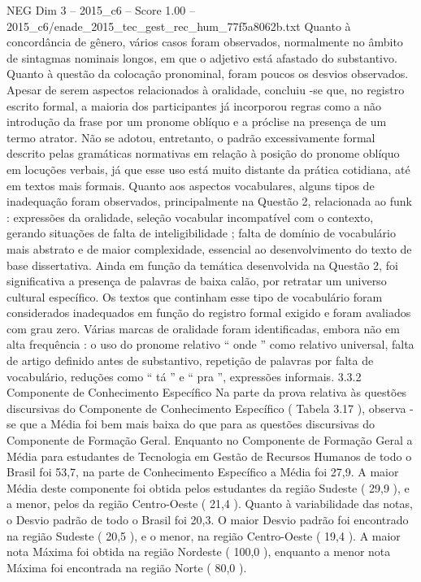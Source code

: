\begin{textsample}{NEG Dim 3 – 2015\_c6 – Score 1.00 – 2015\_c6/enade\_2015\_tec\_gest\_rec\_hum\_77f5a8062b.txt}
Quanto à concordância de gênero, vários casos foram observados, normalmente no âmbito de sintagmas nominais longos, em que o adjetivo está afastado do substantivo.
Quanto à questão da colocação pronominal, foram poucos os desvios observados.
Apesar de serem aspectos relacionados à oralidade, concluiu -se que, no registro escrito formal, a maioria dos participantes já incorporou regras como a não introdução da frase por um pronome oblíquo e a próclise na presença de um termo atrator.
Não se adotou, entretanto, o padrão excessivamente formal descrito pelas gramáticas normativas em relação à posição do pronome oblíquo em locuções verbais, já que esse uso está muito distante da prática cotidiana, até em textos mais formais.
Quanto aos aspectos vocabulares, alguns tipos de inadequação foram observados, principalmente na Questão 2, relacionada ao funk : expressões da oralidade, seleção vocabular incompatível com o contexto, gerando situações de falta de inteligibilidade ; falta de domínio de vocabulário mais abstrato e de maior complexidade, essencial ao desenvolvimento do texto de base dissertativa.
Ainda em função da temática desenvolvida na Questão 2, foi significativa a presença de palavras de baixa calão, por retratar um universo cultural específico.
Os textos que continham esse tipo de vocabulário foram considerados inadequados em função do registro formal exigido e foram avaliados com grau zero.
Várias marcas de oralidade foram identificadas, embora não em alta frequência : o uso do pronome relativo “ onde ” como relativo universal, falta de artigo definido antes de substantivo, repetição de palavras por falta de vocabulário, reduções como “ tá ” e “ pra ”, expressões informais. 3.3.2 Componente de Conhecimento Específico Na parte da prova relativa às questões discursivas do Componente de Conhecimento Específico ( Tabela 3.17 ), observa -se que a Média foi bem mais baixa do que para as questões discursivas do Componente de Formação Geral.
Enquanto no Componente de Formação Geral a Média para estudantes de Tecnologia em Gestão de Recursos Humanos de todo o Brasil foi 53,7, na parte de Conhecimento Específico a Média foi 27,9.
A maior Média deste componente foi obtida pelos estudantes da região Sudeste ( 29,9 ), e a menor, pelos da região Centro-Oeste ( 21,4 ).
Quanto à variabilidade das notas, o Desvio padrão de todo o Brasil foi 20,3.
O maior Desvio padrão foi encontrado na região Sudeste ( 20,5 ), e o menor, na região Centro-Oeste ( 19,4 ).
A maior nota Máxima foi obtida na região Nordeste ( 100,0 ), enquanto a menor nota Máxima foi encontrada na região Norte ( 80,0 ).

\end{textsample}
